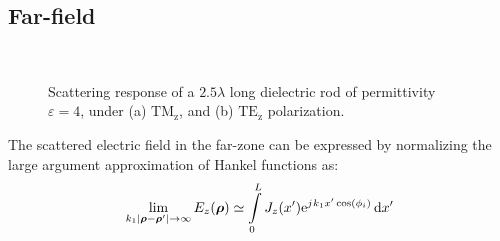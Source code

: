 \documentclass{ieeeaccess}
\newcommand{\E}{\varepsilon}  %
\newcommand{\p}{\rho}  %
\newcommand{\vp}{\boldsymbol \p}  %
\renewcommand{\inf}{\infty}  %
\renewcommand{\^}{\hat}  %
\newcommand*\diff{\mathop{}\!\mathrm{d}} %
\newcommand{\e}{\mathrm{e}} %
\renewcommand{\j}{{j}\mkern1mu} %
\begin{document}
\subsection{Far-field}
\begin{figure}[t!]
  \centering
   \\
  \caption{Scattering response of a $2.5 \lambda$ long dielectric rod of permittivity $\E=4$, under (a) $\mathrm{TM_z}$, and (b) $\mathrm{TE_z}$ polarization.}
  \label{fig:RCS_richmodn}
\end{figure}
%
The scattered electric field in the far-zone can be expressed by normalizing the large argument approximation of Hankel functions as:
%
\begin{equation}
  \lim_{k_1|\vp - \vp'|\to\inf} E_z(\vp) \simeq \int \limits_{0}^{L} J_z(x') \e^{\j k_1 x' \cos(\phi_i)} \diff{x'}
  \label{eq:far-field}
\end{equation}
%
\end{document}

